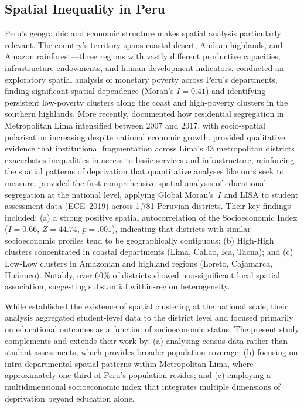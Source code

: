 \documentclass[12pt,a4paper,twoside]{article}
\begin{document}
\subsection{Spatial Inequality in Peru}

Peru's geographic and economic structure makes spatial analysis particularly
relevant. The country's territory spans coastal desert, Andean highlands, and
Amazon rainforest---three regions with vastly different productive capacities,
infrastructure endowments, and human development indicators. \citet{narro2020spatial}
conducted an exploratory spatial analysis of monetary poverty across Peru's
departments, finding significant spatial dependence (Moran's $I = 0.41$) and
identifying persistent low-poverty clusters along the coast and high-poverty
clusters in the southern highlands. More recently, \citet{fernandez2021changes}
documented how residential segregation in Metropolitan Lima intensified between
2007 and 2017, with socio-spatial polarisation increasing despite national
economic growth. \citet{desmaison2023building} provided qualitative evidence that
institutional fragmentation across Lima's 43 metropolitan districts exacerbates
inequalities in access to basic services and infrastructure, reinforcing the
spatial patterns of deprivation that quantitative analyses like ours seek to
measure. \citet{alonso2025segregacion}
provided the first comprehensive spatial analysis of educational segregation at
the national level, applying Global Moran's~$I$ and LISA to student assessment
data (ECE~2019) across 1,781 Peruvian districts. Their key findings included:
(a) a strong positive spatial autocorrelation of the Socioeconomic Index
($I = 0.66$, $Z = 44.74$, $p = .001$), indicating that districts with similar
socioeconomic profiles tend to be geographically contiguous; (b) High-High
clusters concentrated in coastal departments (Lima, Callao, Ica, Tacna); and
(c) Low-Low clusters in Amazonian and highland regions (Loreto, Cajamarca,
Huánuco). Notably, over 60\% of districts showed non-significant local
spatial association, suggesting substantial within-region heterogeneity.

While \citet{alonso2025segregacion} established the existence of spatial clustering
at the national scale, their analysis aggregated student-level data to the district
level and focused primarily on educational outcomes as a function of socioeconomic
status. The present study complements and extends their work by: (a) analysing
census data rather than student assessments, which provides broader population
coverage; (b) focusing on intra-departmental spatial patterns within Metropolitan
Lima, where approximately one-third of Peru's population resides; and (c) employing
a multidimensional socioeconomic index that integrates multiple dimensions of
deprivation beyond education alone.
\end{document}
